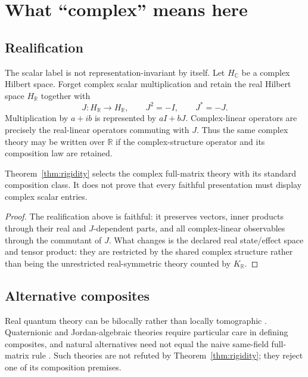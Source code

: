 \documentclass[11pt]{article}
\newcommand{\R}{\mathbb{R}}
\newcommand{\C}{\mathbb{C}}
\begin{document}
\section{What ``complex'' means here}

\subsection{Realification}

The scalar label is not representation-invariant by itself. Let \(H_{\C}\) be a complex Hilbert space. Forget complex scalar multiplication and retain the real Hilbert space \(H_{\R}\) together with
\[
J:H_{\R}\longrightarrow H_{\R},
\qquad
J^2=-I,
\qquad
J^*=-J.
\]
Multiplication by \(a+ib\) is represented by \(aI+bJ\). Complex-linear operators are precisely the real-linear operators commuting with \(J\). Thus the same complex theory may be written over \(\R\) if the complex-structure operator and its composition law are retained.

\begin{proposition}
\label{prop:realification}
Theorem~\ref{thm:rigidity} selects the complex full-matrix theory with its standard composition class. It does not prove that every faithful presentation must display complex scalar entries.
\end{proposition}

\begin{proof}
The realification above is faithful: it preserves vectors, inner products through their real and \(J\)-dependent parts, and all complex-linear observables through the commutant of \(J\). What changes is the declared real state/effect space and tensor product: they are restricted by the shared complex structure rather than being the unrestricted real-symmetric theory counted by \(K_{\R}\).
\end{proof}

\subsection{Alternative composites}

Real quantum theory can be bilocally rather than locally tomographic
\cite{HardyWootters2012}. Quaternionic and Jordan-algebraic theories require particular care in defining composites, and natural alternatives need not equal the naive same-field full-matrix rule
\cite{BarnumWilce2014}. Such theories are not refuted by
Theorem~\ref{thm:rigidity}; they reject one of its composition premises.
\end{document}
